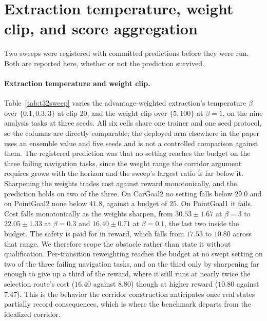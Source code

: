 \documentclass{article} %
\begin{document}
\section{Extraction temperature, weight clip, and score aggregation}
\label{app:t32t26}
Two sweeps were registered with committed predictions before they were run. Both
are reported here, whether or not the prediction survived.

\paragraph{Extraction temperature and weight clip.} Table~\ref{tab:t32sweep}
varies the advantage-weighted extraction's temperature $\beta$ over
$\{0.1, 0.3, 3\}$ at clip $20$, and the weight clip over $\{5, 100\}$ at
$\beta = 1$, on the nine analysis tasks at three seeds. All six cells share one
trainer and one seed protocol, so the columns are directly comparable; the
deployed arm elsewhere in the paper uses an ensemble value and five seeds and is
not a controlled comparison against them. The registered
prediction was that no setting reaches the budget on the three failing
navigation tasks, since the weight range the corridor argument requires grows
with the horizon and the sweep's largest ratio is far below it. Sharpening the
weights trades cost against reward monotonically, and the prediction holds on
two of the three. On CarGoal2 no setting falls below $29.0$ and on PointGoal2
none below $41.8$, against a budget of $25$. On PointGoal1 it fails. Cost falls monotonically as the weights sharpen, from
$30.53 \pm 1.67$ at $\beta = 3$ to $22.05 \pm 1.33$ at $\beta = 0.3$ and
$16.40 \pm 0.71$ at $\beta = 0.1$, the last two inside the budget. The safety is
paid for in reward, which falls from $17.53$ to $10.80$ across that range. We therefore scope the obstacle rather than
state it without qualification. Per-transition reweighting reaches the budget at
no swept setting on two of the three failing navigation tasks, and on the third
only by sharpening far enough to give up a third of the reward, where it still
runs at nearly twice the selection route's cost ($16.40$ against $8.80$) though
at higher reward ($10.80$ against $7.47$). This is the behavior the corridor
construction anticipates once real states partially record consequences, which
is where the benchmark departs from the idealized corridor.
\end{document}
